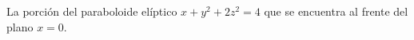 \item La porción del paraboloide elíptico $x + y^2 + 2z^2 = 4$ que se encuentra al frente del plano $x = 0$.
